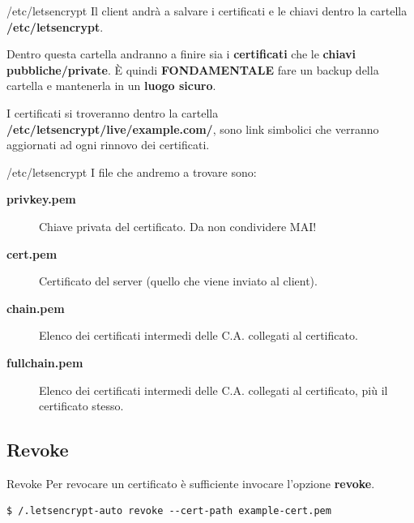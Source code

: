 \documentclass[xcolor=svgnames,11pt]{beamer}
\begin{document}
\begin{frame}{/etc/letsencrypt}
Il client andrà a salvare i certificati e le chiavi dentro la cartella \textbf{/etc/letsencrypt}.

\medskip\pause
{
\begin{block}{}
Dentro questa cartella andranno a finire sia i \textbf{certificati} che le \textbf{chiavi pubbliche/private}.
È quindi \textbf{FONDAMENTALE} fare un backup della cartella e mantenerla in un \textbf{luogo sicuro}.
\end{block}
}
\medskip\pause
I certificati si troveranno dentro la cartella \textbf{/etc/letsencrypt/live/example.com/}, sono link
simbolici che verranno aggiornati ad ogni rinnovo dei certificati.
\end{frame}

\begin{frame}{/etc/letsencrypt}
I file che andremo a trovare sono:
\begin{description}
  \item[\textbf{\small privkey.pem}] Chiave privata del certificato. Da non condividere MAI!
  \item[\textbf{\small cert.pem}] Certificato del server (quello che viene inviato al client).
  \item[\textbf{\small chain.pem}] Elenco dei certificati intermedi delle C.A. collegati al certificato.
  \item[\textbf{\small fullchain.pem}] Elenco dei certificati intermedi delle C.A. collegati al certificato, più il certificato stesso.
\end{description}
\end{frame}

\subsection{Revoke}
\begin{frame}[fragile]{Revoke}
Per revocare un certificato è sufficiente invocare l'opzione \textbf{revoke}.

\medskip\pause

\begin{block}{}
\begin{scriptsize}
\begin{verbatim}
$ /.letsencrypt-auto revoke --cert-path example-cert.pem
\end{verbatim}
\end{scriptsize}
\end{block}
\end{frame}
\end{document}
